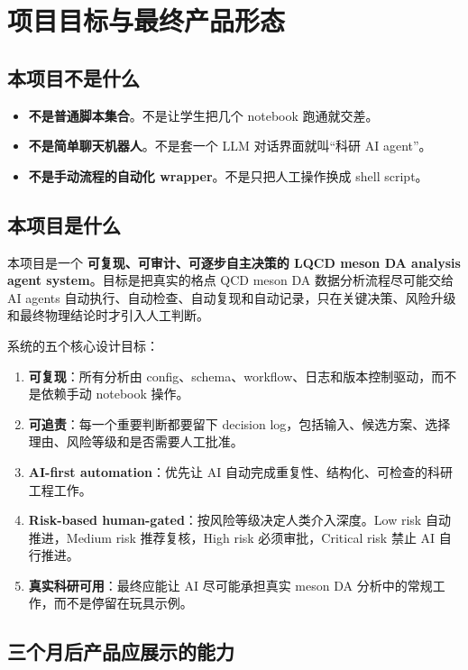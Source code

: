 \documentclass[11pt,a4paper,fontset=fandol]{ctexart}
\begin{document}
\section{项目目标与最终产品形态}

\subsection{本项目不是什么}

\begin{itemize}
  \item \textbf{不是普通脚本集合}。不是让学生把几个 notebook 跑通就交差。
  \item \textbf{不是简单聊天机器人}。不是套一个 LLM 对话界面就叫``科研 AI agent''。
  \item \textbf{不是手动流程的自动化 wrapper}。不是只把人工操作换成 shell script。
\end{itemize}

\subsection{本项目是什么}

本项目是一个 \textbf{可复现、可审计、可逐步自主决策的 LQCD meson DA analysis agent system}。目标是把真实的格点 QCD meson DA 数据分析流程尽可能交给 AI agents 自动执行、自动检查、自动复现和自动记录，只在关键决策、风险升级和最终物理结论时才引入人工判断。

系统的五个核心设计目标：

\begin{enumerate}
  \item \textbf{可复现}：所有分析由 config、schema、workflow、日志和版本控制驱动，而不是依赖手动 notebook 操作。
  \item \textbf{可追责}：每一个重要判断都要留下 decision log，包括输入、候选方案、选择理由、风险等级和是否需要人工批准。
  \item \textbf{AI-first automation}：优先让 AI 自动完成重复性、结构化、可检查的科研工程工作。
  \item \textbf{Risk-based human-gated}：按风险等级决定人类介入深度。Low risk 自动推进，Medium risk 推荐复核，High risk 必须审批，Critical risk 禁止 AI 自行推进。
  \item \textbf{真实科研可用}：最终应能让 AI 尽可能承担真实 meson DA 分析中的常规工作，而不是停留在玩具示例。
\end{enumerate}

\subsection{三个月后产品应展示的能力}
\end{document}
